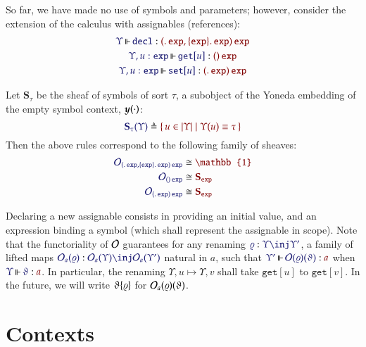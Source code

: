 So far, we have made no use of symbols and parameters; however, consider the
extension of the calculus with assignables (references):
%
\begin{gather*}
  \IsOperator{\Upsilon}{\mathtt{decl}}{
    \MkArity{
      \MkValence{}{}{\SortExp},
      \MkValence{\SortExp}{}{\SortExp}
    }{
      \SortExp
    }
  }
\\
  \IsOperator{\Upsilon,u:\SortExp}{\mathtt{get}[u]}{
    \MkArity{}{\SortExp}
  }
\\
  \IsOperator{\Upsilon,u:\SortExp}{\mathtt{set}[u]}{
    \MkArity{
      \MkValence{}{}{\SortExp}
    }{
      \SortExp
    }
  }
\end{gather*}

Let $\mathbf{S}_\tau$ be the sheaf of symbols of sort $\tau$, a subobject of
the Yoneda embedding of the empty symbol context, $\boldsymbol{y} (\cdot)$:
\[
  \Define{\mathbf{S}_\tau(\Upsilon)}{
    \MkSet{
      u\in\Dom{\Upsilon}
      \mid
      \Upsilon(u) \equiv \tau
    }
  }
\]
%
Then the above rules correspond to the following family of sheaves:
\begin{align*}
  \ADefineEquiv{
    \Operators_{
      \MkArity{
        \MkValence{}{}{\SortExp},
        \MkValence{\SortExp}{}{\SortExp}
      }{
        \SortExp
      }
    }
  }{
    \mathbb{1}
  }\\
  \ADefineEquiv{
    \Operators_{
      \MkArity{}{\SortExp}
    }
  }{
    \mathbf{S}_\SortExp
  }\\
  \ADefineEquiv{
    \Operators_{
      \MkArity{
        \MkValence{}{}{\SortExp}
      }{
        \SortExp
      }
    }
  }{
    \mathbf{S}_\SortExp
  }
\end{align*}

Declaring a new assignable consists in providing an initial value, and an
expression binding a symbol (which shall represent the assignable in scope).
Note that the functoriality of $\mathcal{O}$ guarantees for any renaming
$\Of{\varrho}{\Upsilon\inj\Upsilon'}$, a family of lifted maps
$\Of{\Operators_a(\varrho)}{\Operators_a(\Upsilon)\inj\Operators_a(\Upsilon')}$
natural in $a$, such that
$\IsOperator{\Upsilon'}{\Operators(\varrho)(\vartheta)}{a}$ when
$\IsOperator{\Upsilon}{\vartheta}{a}$. In particular, the renaming
$\Upsilon,u\mapsto\Upsilon,v$ shall take $\mathtt{get}[u]$ to
$\mathtt{get}[v]$. In the future, we will write $\vartheta\{\varrho\}$
for $\mathcal{O}_a(\varrho)(\vartheta)$.


\section{Contexts}

